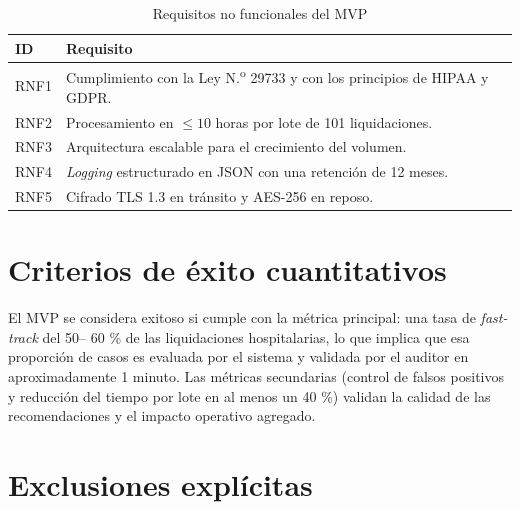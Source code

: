 \begin{table}[H]
    \centering
    \caption{Requisitos no funcionales del MVP}
    \label{tab:requisitos-no-funcionales-mvp}

    \footnotesize
    \setlength{\tabcolsep}{8pt}
    \renewcommand{\arraystretch}{1.25}

    \begin{tabular}{
        p{}
        p{}
    }
        \toprule
        \textbf{ID}
        & \textbf{Requisito} \\
        \midrule

        RNF1
        & Cumplimiento con la Ley N.\textsuperscript{o} 29733 y con los
          principios de HIPAA y GDPR. \\

        RNF2
        & Procesamiento en $\leq 10$ horas por lote de 101 liquidaciones. \\

        RNF3
        & Arquitectura escalable para el crecimiento del volumen. \\

        RNF4
        & \textit{Logging} estructurado en JSON con una retención de
          12 meses. \\

        RNF5
        & Cifrado TLS 1.3 en tránsito y AES-256 en reposo. \\

        \bottomrule
    \end{tabular}
\end{table}
\section{Criterios de éxito cuantitativos}

El MVP se considera exitoso si cumple con la métrica principal: una tasa de \textit{fast-track} del 50– 60 \% de las liquidaciones hospitalarias, lo que implica que esa proporción de casos es evaluada por el sistema y validada por el auditor en aproximadamente 1 minuto. Las métricas secundarias (control de falsos positivos y reducción del tiempo por lote en al menos un 40 \%) validan la calidad de las recomendaciones y el impacto operativo agregado.

\section{Exclusiones explícitas}

